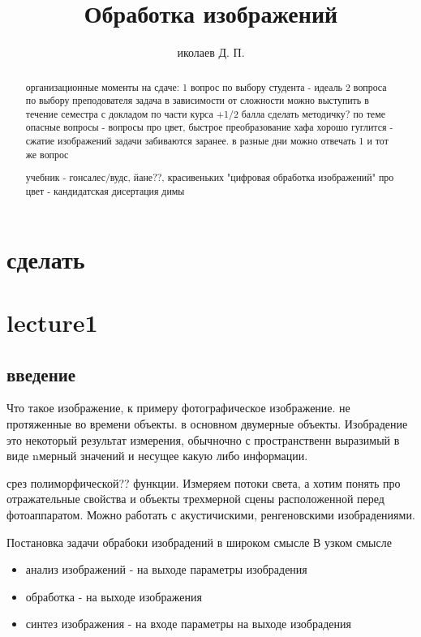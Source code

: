 \documentclass[]{report}
\title{Обработка изображений}
\author{иколаев Д. П.}
\begin{document}
\maketitle

\begin{abstract}
	организационные моменты
	на сдаче:
		1 вопрос по выбору студента - идеаль
		2 вопроса по выбору преподователя
		задача в зависимости от сложности
	можно выступить в течение семестра с докладом по части курса +1/2 балла
	сделать методичку? по теме
	опасные вопросы - вопросы про цвет, быстрое преобразование хафа
	хорошо гуглится - сжатие изображений
	задачи забиваются заранее.
	в разные дни можно отвечать 1 и тот же вопрос
	
	учебник - гонсалес/вудс, йане??, красивеньких "цифровая обработка изображений"
	про цвет - кандидатская дисертация димы
\end{abstract}

\chapter{сделать}

\chapter{lecture1}

\section{введение}
Что такое изображение, к примеру фотографическое изображение.
не протяженные во времени объекты. в основном двумерные объекты.
Изобрадение это некоторый результат измерения, обычночно с пространственн выразимый в виде nмерный значений и несущее какую либо информации. 

срез полиморфической?? функции. Измеряем потоки света, а хотим понять про отражательные свойства и объекты трехмерной сцены расположенной перед фотоаппаратом. Можно работать с акустичискими, ренгеновскими изобрадениями.

Постановка задачи обрабоки изобрадений в широком смысле
В узком смысле 
\begin{itemize}
	\item анализ изображений - на выходе параметры изобрадения
	\item обработка - на выходе изображения
	\item синтез изображения - на входе параметры на выходе изобрадения
\end{itemize}
\end{document}
